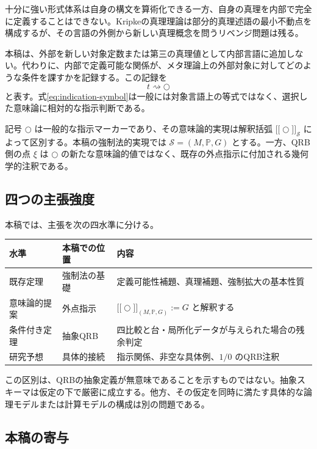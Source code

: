 \documentclass[a4paper,11pt]{ltjsarticle}
\theoremstyle{definition}
\theoremstyle{plain}
\newcommand{\dfix}{\bigcirc}
\newcommand{\sem}[1]{\mathopen{[\![}#1\mathclose{]\!]}}
\begin{document}
十分に強い形式体系は自身の構文を算術化できる一方、自身の真理を内部で完全に定義することはできない\cite{godel,tarski}。Kripkeの真理理論は部分的真理述語の最小不動点を構成するが、その言語の外側から新しい真理概念を問うリベンジ問題は残る\cite{kripke}。

本稿は、外部を新しい対象定数または第三の真理値として内部言語に追加しない。代わりに、内部で定義可能な関係が、メタ理論上の外部対象に対してどのような条件を課すかを記録する。この記録を
\begin{equation}
 t\rightsquigarrow\dfix
 \label{eq:indication-symbol}
\end{equation}
と表す。式\eqref{eq:indication-symbol}は一般には対象言語上の等式ではなく、選択した意味論に相対的な指示判断である。

記号 $\dfix$ は一般的な指示マーカーであり、その意味論的実現は解釈括弧 $\sem{\dfix}_{\mathcal S}$ によって区別する。本稿の強制法的実現では $\mathcal S=(M,\mathbb P,G)$ とする。一方、QRB側の点 $\xi$ は $\dfix$ の新たな意味論的値ではなく、既存の外点指示に付加される幾何学的注釈である。

\subsection{四つの主張強度}

本稿では、主張を次の四水準に分ける。

\begin{center}
\begin{tabular}{p{} p{} p{}}
\toprule
水準 & 本稿での位置 & 内容 \\
\midrule
既存定理 & 強制法の基礎 & 定義可能性補題、真理補題、強制拡大の基本性質 \\
意味論的提案 & 外点指示 & $\sem{\dfix}_{(M,\mathbb P,G)}:=G$ と解釈する \\
条件付き定理 & 抽象QRB & 四比較と台・局所化データが与えられた場合の残余判定 \\
研究予想 & 具体的接続 & 指示関係、非空な具体例、$1/0$ のQRB注釈 \\
\bottomrule
\end{tabular}
\end{center}

この区別は、QRBの抽象定義が無意味であることを示すものではない。抽象スキーマは仮定の下で厳密に成立する。他方、その仮定を同時に満たす具体的な論理モデルまたは計算モデルの構成は別の問題である。

\subsection{本稿の寄与}
\end{document}
